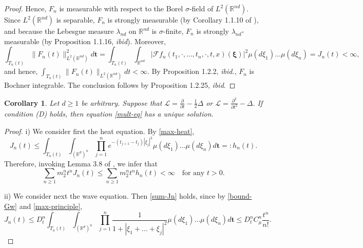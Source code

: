 \documentclass[12pt]{article}
\newtheorem{corollary}[theorem]{Corollary}
\def\cF{\mathcal{F}}
\def\cL{\mathcal{L}}
\def\bR{\mathbb{R}}
\begin{document}
\begin{proof}
Hence, $F_n$ is measurable with respect to the Borel $\sigma$-field of $L^2(\bR^{nd})$.
Since $L^2(\bR^{nd})$ is separable, $F_n$ is strongly measurable (by Corollary 1.1.10 of \cite{HNVW}), and because the Lebesgue measure $\lambda_{nd}$ on $\bR^{nd}$ is $\sigma$-finite, $F_n$ is strongly $\lambda_{nd}$-measurable (by Proposition 1.1.16, {\em ibid}). Moreover,
\[
\int_{T_n(t)}\|F_n(t)\|_{L^2(\bR^{nd})}^2 d\pmb{t}=\int_{T_n(t)} \int_{\bR^{nd}}|\cF f_n(t_1,\cdot,\ldots,t_n,\cdot,t,x)(\pmb{\xi})|^2 \mu(d\xi_1)\ldots \mu(d\xi_n)=J_n(t)<\infty,
\]
and hence, $\int_{T_n(t)} \|F_n(t)\|_{L^2(\bR^{nd})} dt <\infty$. By Proposition 1.2.2, {\em ibid.}, $F_n$ is Bochner integrable. The conclusion follows by Proposition 1.2.25, {\em ibid}.

\end{proof}



\begin{corollary}
Let $d\geq 1$ be arbitrary. 
Suppose that $\cL=\frac{\partial}{\partial t}-\frac{1}{2}\Delta$  or
$\cL=\frac{\partial^2}{\partial t^2}-\Delta$. If condition (D) holds, then equation \eqref{mult-eq} has a unique solution.
\end{corollary}

\begin{proof}
i) We consider first the heat equation. 
By \eqref{max-heat},
\[
J_n(t) \leq \int_{T_n(t)} \int_{(\bR^d)^n} \prod_{j=1}^{n}e^{-(t_{j+1}-t_j)|\xi_j|^2} \mu(d\xi_1)\ldots \mu(d\xi_n) d\pmb{t}=:h_n(t).
\]
Therefore, invoking Lemma 3.8 of \cite{BC18}, we infer that
\[
\sum_{n\geq 1} m_2^n t^n J_n(t)\leq \sum_{n\geq 1}m_2^nt^n h_n(t)<\infty \quad \mbox{for any $t>0$}.
\]


\medskip

ii) We consider next the wave equation. Then \eqref{sum-Jn} holds, since by \eqref{bound-Gw} and \eqref{max-principle}, 
\[
J_n(t) \leq D_t^n \int_{T_n(t)} \int_{(\bR^d)^n} \prod_{j=1}^{n}\frac{1}{1+|\xi_1+\ldots+\xi_j|^2}\mu(d\xi_1)\ldots \mu(d\xi_n)d\pmb{t} \leq D_t^n C_{\mu}^n \frac{t^n}{n!}.
\]
\end{proof}
\end{document}
